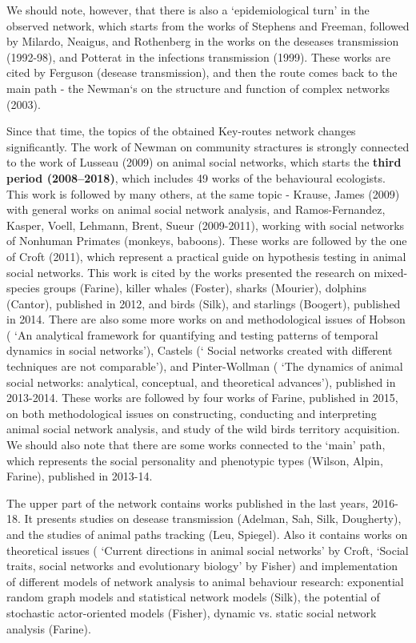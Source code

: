 \documentclass[11pt]{article} %
\begin{document}
We should note, however, that there is also a `epidemiological turn' in the observed network, which starts from the works of Stephens and Freeman, followed by Milardo, Neaigus, and Rothenberg in the works on the deseases transmission (1992-98), and Potterat in the infections transmission (1999). These works are cited by Ferguson (desease transmission), and then the route comes back to the main path - the Newman`s on the structure and function of complex networks (2003). \medskip 

 Since that time, the topics of the obtained Key-routes network changes significantly. The work of Newman on community stractures is strongly connected to the work of Lusseau (2009) on animal social networks, which starts the \textbf{third period (2008--2018)}, which includes 49 works of the behavioural ecologists. This work is followed by many others, at the same topic - Krause, James (2009) with general works on animal social network analysis, and Ramos-Fernandez, Kasper, Voell, Lehmann, Brent, Sueur (2009-2011), working with social networks of Nonhuman Primates (monkeys, baboons). These works are followed by the one of Croft (2011), which represent a practical guide on  hypothesis testing in animal social networks. This work is cited by the works presented the research on mixed-species groups (Farine), killer whales (Foster), sharks (Mourier), dolphins (Cantor), published in 2012, and birds (Silk), and starlings (Boogert), published in 2014. There are also some more works on and methodological issues of Hobson ( `An analytical framework for quantifying and testing patterns of temporal dynamics in social networks'), Castels (` Social networks created with different techniques are not comparable'), and Pinter-Wollman ( `The dynamics of animal social networks: analytical, conceptual, and theoretical advances'), published in 2013-2014. These works are followed by four works of Farine, published in 2015, on both methodological issues on constructing, conducting and interpreting animal social network analysis, and study of the wild birds territory acquisition. We should also note that there are some works connected to the `main' path, which represents the social personality and phenotypic types (Wilson, Alpin, Farine), published in 2013-14.\medskip   
 
The upper part of the network contains works published in the last years, 2016-18. It presents studies on desease transmission (Adelman, Sah, Silk, Dougherty), and the studies of animal paths tracking (Leu, Spiegel). Also it contains works on theoretical issues ( `Current directions in animal social networks' by Croft, `Social traits, social networks and evolutionary biology' by Fisher) and implementation of different models of network analysis to animal behaviour research:  exponential random graph models and statistical network models (Silk), the potential of stochastic actor-oriented models (Fisher),  dynamic vs. static social network analysis (Farine). \medskip   
\end{document}
